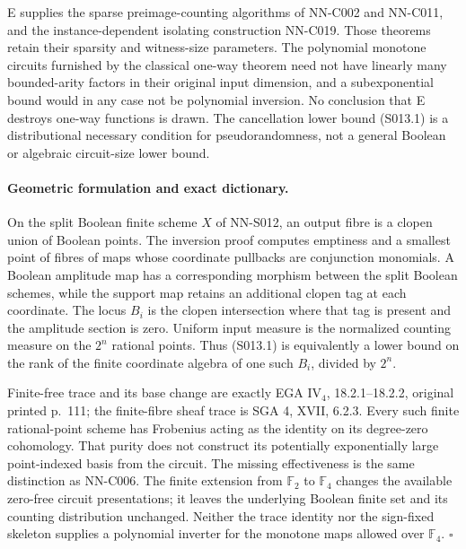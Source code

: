 E supplies the sparse preimage-counting algorithms of NN-C002 and
NN-C011, and the instance-dependent isolating construction NN-C019.
Those theorems retain their sparsity and witness-size parameters.
The polynomial monotone circuits furnished by the classical one-way
theorem need not have linearly many bounded-arity factors in their
original input dimension, and a subexponential bound would in any
case not be polynomial inversion. No conclusion that E destroys
one-way functions is drawn. The cancellation lower bound (S013.1)
is a distributional necessary condition for pseudorandomness, not a
general Boolean or algebraic circuit-size lower bound.

\paragraph{Geometric formulation and exact dictionary.}
On the split Boolean finite scheme $X$ of NN-S012, an output fibre
is a clopen union of Boolean points. The inversion proof computes
emptiness and a smallest point of fibres of maps whose coordinate
pullbacks are conjunction monomials. A Boolean amplitude map has
a corresponding morphism between the split Boolean schemes, while
the support map retains an additional clopen tag at each coordinate.
The locus $B_i$ is the clopen intersection where that tag is present
and the amplitude section is zero. Uniform input measure is the
normalized counting measure on the $2^n$ rational points. Thus
(S013.1) is equivalently a lower bound on the rank of the finite
coordinate algebra of one such $B_i$, divided by $2^n$.

Finite-free trace and its base change are exactly EGA IV$_4$,
18.2.1--18.2.2, original printed p.~111; the finite-fibre sheaf trace
is SGA 4, XVII, 6.2.3. Every such finite rational-point scheme has
Frobenius acting as the identity on its degree-zero cohomology.
That purity does not construct its potentially exponentially large
point-indexed basis from the circuit. The missing effectiveness is
the same distinction as NN-C006. The finite extension from
$\mathbb F_2$ to $\mathbb F_4$ changes the available zero-free circuit
presentations; it leaves the underlying Boolean finite set and its
counting distribution unchanged. Neither the trace identity nor
the sign-fixed skeleton supplies a polynomial inverter for the
monotone maps allowed over $\mathbb F_4$.
\hfill$\square$
